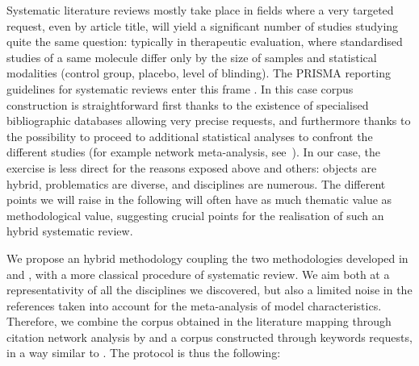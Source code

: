 \documentclass[10pt]{article}
\begin{document}
Systematic literature reviews mostly take place in fields where a very targeted request, even by article title, will yield a significant number of studies studying quite the same question: typically in therapeutic evaluation, where standardised studies of a same molecule differ only by the size of samples and statistical modalities (control group, placebo, level of blinding). The PRISMA reporting guidelines for systematic reviews enter this frame \cite{moher2009preferred}. In this case corpus construction is straightforward first thanks to the existence of specialised bibliographic databases allowing very precise requests, and furthermore thanks to the possibility to proceed to additional statistical analyses to confront the different studies (for example network meta-analysis, see~\cite{rucker2012network}). In our case, the exercise is less direct for the reasons exposed above and others: objects are hybrid, problematics are diverse, and disciplines are numerous. The different points we will raise in the following will often have as much thematic value as methodological value, suggesting crucial points for the realisation of such an hybrid systematic review.


We propose an hybrid methodology coupling the two methodologies developed in \cite{raimbault2017models} and \cite{raimbault2019exploration}, with a more classical procedure of systematic review. We aim both at a representativity of all the disciplines we discovered, but also a limited noise in the references taken into account for the meta-analysis of model characteristics. Therefore, we combine the corpus obtained in the literature mapping through citation network analysis by \cite{raimbault2018caracterisation} and a corpus constructed through keywords requests, in a way similar to \cite{tahamtan2018core}. The protocol is thus the following:
\end{document}
